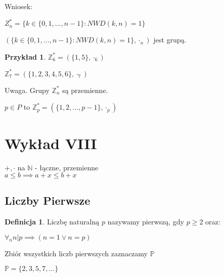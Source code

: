 \documentclass{article}
\theoremstyle{definition}
\newtheorem{de}{Definicja}[subsection]
\theoremstyle{definition}
\theoremstyle{definition}
\newtheorem{pk}{Przykład}[subsection]
\theoremstyle{definition}
\begin{document}
Wniosek:
\begin{center}
$Z_n^* = \{k\in \{0,1,...,n-1\}: NWD(k,n)=1\}$
\end{center}

$(\{k\in \{0,1,...,n-1\}: NWD(k,n)=1\},\cdot_n)$ jest grupą.

\begin{pk}
    \item $\mathbb{Z}_6^*=(\{1,5\}, \cdot_6)$
    \item $\mathbb{Z}_7^*=(\{1,2,3,4,5,6\}, \cdot_7)$ 
\end{pk}

Uwaga. Grupy $\mathbb{Z}_n^*$ są przemienne.
 
$p\in P$ to $\mathbb{Z}_p^* = (\{1,2,\dots,p-1\}, \cdot_p)$

\section{Wykład VIII}
$+, \cdot$ na $\mathbb{N}$ - łączne, przemienne\\
$a\leq b \implies a+x\leq b+x$

\subsection{Liczby Pierwsze}

\begin{de}
    Liczbę naturalną $p$ nazywamy pierwszą, gdy $p\geq 2$ oraz:
    \begin{center}
        $\forall_{n} n|p \implies (n=1 \lor n=p)$
    \end{center}
\end{de}

Zbiór wszystkich liczb pierwszych zaznaczamy $\mathbb{P}$
\begin{center}
    $\mathbb{P}=\{2,3,5,7,\dots\}$
\end{center}
\end{document}
